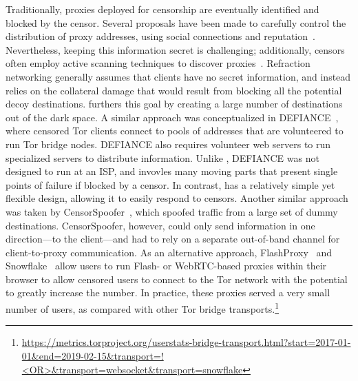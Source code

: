 Traditionally, proxies deployed for censorship are eventually identified and
blocked by the censor. Several proposals have been made to carefully control
the distribution of proxy addresses, using social connections and
reputation~\cite{proximax,rbridge,salmon}. Nevertheless, keeping this
information secret is challenging; additionally, censors often employ active
scanning techniques to discover proxies~\cite{Dunna2018a}. Refraction
networking generally assumes that clients have no secret information, and
instead relies on the  collateral damage that would result from blocking all
the potential decoy destinations. \scheme furthers this goal by creating a
large number of destinations out of the dark space. A similar approach was
conceptualized in DEFIANCE~\cite{lincoln2012}, where censored Tor clients
connect to pools of addresses that are volunteered to run Tor bridge nodes.
DEFIANCE also requires volunteer web servers to run specialized servers to
distribute information. Unlike \scheme, DEFIANCE was not designed to run at an
ISP, and invovles many moving parts that present single points of failure if
blocked by a censor. In contrast, \scheme has a relatively simple yet flexible
design, allowing it to easily respond to censors.
Another similar approach was
taken by CensorSpoofer~\cite{censorspoofer}, which spoofed traffic from a large
set of dummy destinations. CensorSpoofer, however, could only send information
in one direction---to the client---and had to rely on a separate out-of-band
channel for client-to-proxy communication. As an alternative approach,
FlashProxy~\cite{flash-proxies} and Snowflake~\cite{snowflake} allow users to
run Flash- or WebRTC-based proxies within their browser to allow censored users
to connect to the Tor network with the potential to greatly increase the
number. In practice, these proxies served a very small number of users, as
compared with other Tor bridge transports.\footnote{\url{https://metrics.torproject.org/userstats-bridge-transport.html?start=2017-01-01&end=2019-02-15&transport=!<OR>&transport=websocket&transport=snowflake}}
